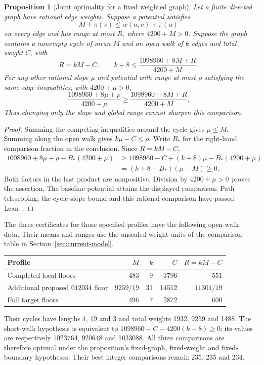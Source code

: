 \documentclass[11pt,a4paper]{article}
\newtheorem{proposition}[theorem]{Proposition}
\theoremstyle{definition}
\theoremstyle{remark}
\begin{document}
\begin{proposition}[Joint optimality for a fixed weighted graph]\label{prop:joint-potential-optimality}
Let a finite directed graph have rational edge weights. Suppose a potential
satisfies
\[
M+\pi(v)\le w(u,v)+\pi(u)
\]
on every edge and has range at most $R$, where $4200+M>0$. Suppose the graph
contains a nonempty cycle of mean $M$ and an open walk of $k$ edges and total
weight $C$, with
\[
R=kM-C,\qquad
k+8\le\frac{1098960+8M+R}{4200+M}.
\]
For any other rational slope $\mu$ and potential with range at most $\rho$
satisfying the same edge inequalities, with $4200+\mu>0$,
\[
\frac{1098960+8\mu+\rho}{4200+\mu}
\ge\frac{1098960+8M+R}{4200+M}.
\]
Thus changing only the slope and global range cannot sharpen this comparison.
\end{proposition}
\begin{proof}
Summing the competing inequalities around the cycle gives $\mu\le M$.
Summing along the open walk gives $k\mu-C\le\rho$. Write $B_*$ for the
right-hand comparison fraction in the conclusion. Since $R=kM-C$,
\[
\begin{aligned}
1098960+8\mu+\rho-B_*(4200+\mu)
&\ge1098960-C+(k+8)\mu-B_*(4200+\mu)\\
&=(k+8-B_*)(\mu-M)\ge0.
\end{aligned}
\]
Both factors in the last product are nonpositive. Division by
$4200+\mu>0$ proves the assertion. The baseline potential attains the
displayed comparison. Path telescoping, the cycle slope bound and this
rational comparison have passed Lean~\cite{potentialcomparisonarchive}.
\end{proof}

The three certificates for those specified profiles have the following
open-walk data. Their means and ranges use the unscaled weight units of
the comparison table in Section~\ref{sec:current-model}.
\begin{center}\small
\begin{tabular}{l r r r r}
\toprule
Profile & $M$ & $k$ & $C$ & $R=kM-C$\\\midrule
Completed local floors & $483$ & 9 & 3796 & $551$\\
Additional proposed $012034$ floor & $9259/19$ & 31 & 14512 & $11301/19$\\
Full target floors & $496$ & 7 & 2872 & $600$\\
\bottomrule
\end{tabular}
\end{center}
Their cycles have lengths 4, 19 and 3 and total weights 1932, 9259 and 1488.
The short-walk hypothesis is equivalent to
$1098960-C-4200(k+8)\ge0$; its values are respectively 1023764, 920648 and
1033088. All three comparisons are therefore optimal under the proposition's
fixed-graph, fixed-weight and fixed-boundary hypotheses. Their best integer
comparisons remain 235, 235 and 234.
\end{document}

